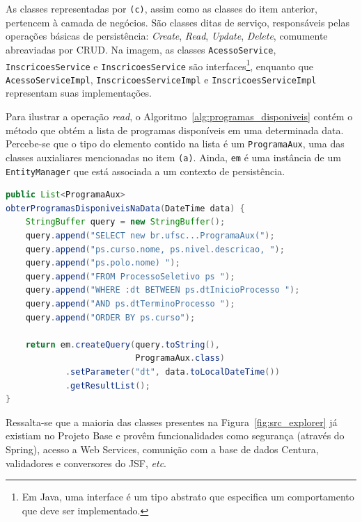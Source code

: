 \documentclass[
  10.5pt,				  %
	openright,			%
	twoside,			  %
  a5paper,
  chapter=TITLE,	%
	section=TITLE,	%
  hyphens,        %
	english,        %
	brazil          %
]{abntex2}
\begin{document}
As classes representadas por \texttt{(c)}, assim como as classes do item anterior, pertencem à camada de negócios. São classes ditas de serviço, responsáveis pelas operações básicas de persistência: \emph{Create}, \emph{Read}, \emph{Update}, \emph{Delete}, comumente abreaviadas por CRUD. Na imagem, as classes \texttt{AcessoService}, \texttt{InscricoesService} e \texttt{InscricoesService} são interfaces\footnote{Em Java, uma interface é um tipo abstrato que especifica um comportamento que deve ser implementado.}, enquanto que \texttt{AcessoServiceImpl}, \texttt{InscricoesServiceImpl} e \texttt{InscricoesServiceImpl} representam suas implementações.



Para ilustrar a operação \emph{read}, o Algoritmo~\ref{alg:programas_disponiveis} contém o método que obtém a lista de programas disponíveis em uma determinada data. Percebe-se que o tipo do elemento contido na lista é um \texttt{ProgramaAux}, uma das classes auxialiares mencionadas no item \texttt{(a)}. Ainda, \texttt{em} é uma instância de um \texttt{EntityManager} que está associada a um contexto de persistência.


\begin{lstlisting}[language=java, caption={Obtenção da lista de programas disponíveis.}, label={alg:programas_disponiveis}]
public List<ProgramaAux>
obterProgramasDisponiveisNaData(DateTime data) {
    StringBuffer query = new StringBuffer();
    query.append("SELECT new br.ufsc...ProgramaAux(");
    query.append("ps.curso.nome, ps.nivel.descricao, ");
    query.append("ps.polo.nome) ");
    query.append("FROM ProcessoSeletivo ps ");
    query.append("WHERE :dt BETWEEN ps.dtInicioProcesso ");
    query.append("AND ps.dtTerminoProcesso ");
    query.append("ORDER BY ps.curso");

    return em.createQuery(query.toString(),
                          ProgramaAux.class)
            .setParameter("dt", data.toLocalDateTime())
            .getResultList();
}
\end{lstlisting}
%


Ressalta-se que a maioria das classes presentes na Figura~\ref{fig:src_explorer} já existiam no Projeto Base e provêm funcionalidades como segurança (através do Spring), acesso a Web Services, comunição com a base de dados Centura, validadores e conversores do JSF, \emph{etc}.
\end{document}
